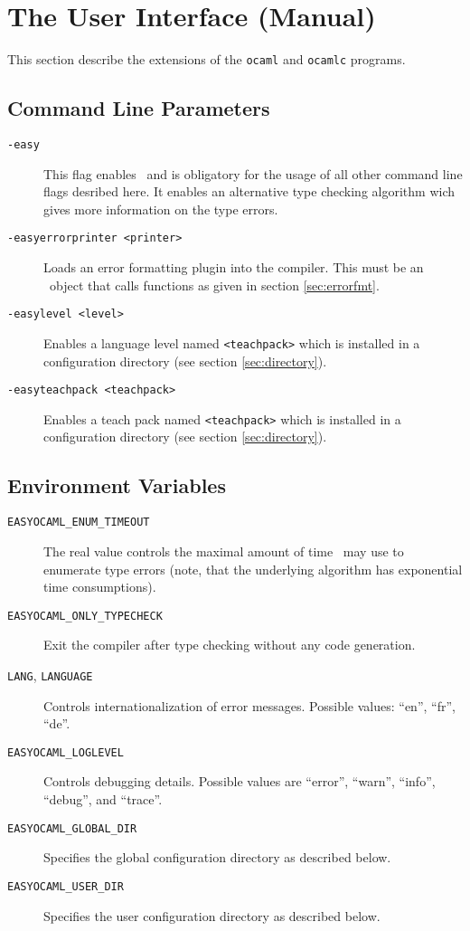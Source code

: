 
\section{The User Interface (Manual)}
\label{sec:manual}

This section describe the extensions of the \texttt{ocaml} and \texttt{ocamlc} programs.

\subsection{Command Line Parameters}
\label{sec:commandlineflags}

\begin{description}
  \item[\texttt{-easy}] This flag enables \easyocaml\ and is obligatory for
    the usage of all other command line flags desribed here.
    It enables an alternative type checking algorithm wich gives more
    information on the type errors.
  \item[\texttt{-easyerrorprinter <printer>}] Loads an error formatting plugin
    into the compiler. This must be an \ocaml\ object that calls functions as
    given in section \ref{sec:errorfmt}.
  \item[\texttt{-easylevel <level>}] Enables a language level named
    \texttt{<teachpack>} which is installed in a configuration directory (see
    section \ref{sec:directory}).
  \item[\texttt{-easyteachpack <teachpack>}] Enables a teach pack named
    \texttt{<teachpack>} which is installed in a configuration directory (see
    section \ref{sec:directory}).
\end{description}

\subsection{Environment Variables}

\begin{description}
  \item[\texttt{EASYOCAML\_ENUM\_TIMEOUT}] \label{man:timeout}
    The real value controls the maximal amount of
    time \easyocaml\ may use to enumerate type errors (note, that the underlying algorithm
    has exponential time consumptions).
  \item[\texttt{EASYOCAML\_ONLY\_TYPECHECK}] Exit the compiler after type checking without any code generation.
  \item[\texttt{LANG}, \texttt{LANGUAGE}]  Controls internationalization of error messages. Possible
    values: ``en'', ``fr'', ``de''.
  \item[\texttt{EASYOCAML\_LOGLEVEL}] Controls debugging details. Possible values are ``error'', ``warn'', ``info'', ``debug'', and ``trace''.
  \item[\texttt{EASYOCAML\_GLOBAL\_DIR}] Specifies the global configuration directory as described below.
  \item[\texttt{EASYOCAML\_USER\_DIR}] Specifies the user configuration directory as described below.
\end{description}

